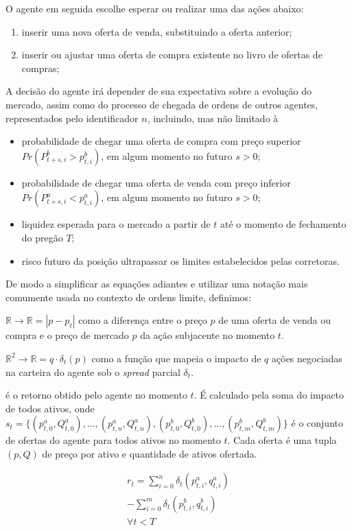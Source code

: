 O agente em seguida escolhe esperar ou realizar uma das ações abaixo:
\begin{enumerate}
    \item inserir uma nova oferta de venda, substituindo a oferta anterior;
    \item inserir ou ajustar uma oferta de compra existente no livro de ofertas de compras;
\end{enumerate}

A decisão do agente irá depender de sua expectativa sobre a evolução do mercado, assim como do processo de chegada de ordens de outros agentes, representados pelo identificador $n$, incluindo, mas não limitado à
\begin{itemize}
    \item probabilidade de chegar uma oferta de compra com preço superior $Pr(P_{t + s, i}^{b} > p_{t, i}^{b})$, em algum momento no futuro $s > 0$;
    \item probabilidade de chegar uma oferta de venda com preço inferior $Pr(P_{t + s, i}^{a} < p_{t, i}^{a})$, em algum momento no futuro $s > 0$;
    \item liquidez esperada para o mercado a partir de $t$ até o momento de fechamento do pregão $T$;
    \item risco futuro da posição ultrapassar os limites estabelecidos pelas corretoras.
\end{itemize}

De modo a simplificar as equações adiantes e utilizar uma notação mais comumente usada no contexto de ordens limite, definimos:

\begin{description}[]
	\item[$\delta_{t}(p)$:] $\mathbb{R} \rightarrow \mathbb{R} = |p - p_{t}|$ como a diferença entre o preço $p$ de uma oferta de venda ou compra e o preço de mercado $p$ da ação subjacente no momento $t$.
	
	\item[$\delta_{t}(p, q)$:] $\mathbb{R}^{2} \rightarrow \mathbb{R} = q \cdot \delta_{t}(p)$ como a função que mapeia o impacto de $q$ ações negociadas na carteira do agente sob o \textit{spread} parcial $\delta_t$.
	
	\item[$r_{t}$] é o retorno obtido pelo agente no momento $t$. É calculado pela soma do impacto de todos ativos, onde $s_{t} = \{(p_{t, 0}^{a}, Q_{t, 0}^{a}), ..., (p_{t, n}^{a}, Q_{t, n}^{a}), (p_{t, 0}^{b}, Q_{t, 0}^{b}), ..., (p_{t, m}^{b}, Q_{t, m}^{b})\}$ é o conjunto de ofertas do agente para todos ativos no momento $t$. Cada oferta é uma tupla $(p, Q)$ de preço por ativo e quantidade de ativos ofertada.
	
	\begin{equation} \label{return}
		\begin{aligned}
			r_{t} = \sum_{i = 0}^{n} \delta_{t}(p_{t, i}^{a}, q_{t, i}^{a}) \\
			-\sum_{i = 0}^{m} \delta_{t}(p_{t, i}^{b}, q_{t, i}^{b}) \\
			\forall t < T
		\end{aligned}
	\end{equation}
\end{description}

